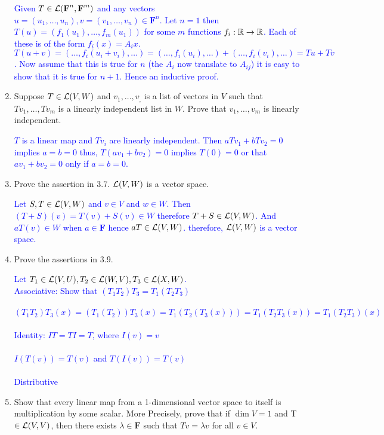 \documentclass[10pt,a4paper]{report}
\newcommand{\BLUE}[1]{\textcolor{blue}{#1}}
\newcommand{\F}{\textbf{F}}
\begin{document}
\begin{enumerate}
\BLUE{Given $T \in \LL(\F^n,\F^m)$ and any vectors $u=(u_1,\dots, u_n),v=(v_1,\dots,v_n) \in \F^n$.  Let $n=1$ then $T(u)=(f_1(u_1), \dots, f_m(u_1))$ for some $m$ functions $f_i: \mathbb{R} \to \mathbb{R}$. Each of these is of the form $f_i(x)= A_ix$. $T(u+v)=(\dots,f_i(u_i+v_i),\dots)=(\dots,f_i(u_i),\dots)+(\dots,f_i(v_i),\dots) = Tu+Tv$.  Now assume that this is true for $n$ (the $A_i$ now translate to $A_{ij}$) it is easy to show that it is true for $n+1$.  Hence an inductive proof.
}

\item Suppose $T \in \mathcal{L}(V,W)$ and $v_1,\dots,v_,$ is a list of vectors in $V$ such that $Tv_1,\dots,Tv_m$ is a linearly independent list in $W$.  Prove that $v_1, \dots, v_m$ is linearly independent.

\BLUE{$T$ is a linear map and $Tv_i$ are linearly independent.  Then $aTv_1+bTv_2=0$ implies $a=b=0$ thus, $T(av_1+bv_2)=0$ implies $T(0)=0$ or that $av_1+bv_2=0$ only if $a=b=0$.
}

\item Prove the assertion in 3.7.  $\mathcal{L}(V,W)$ is a vector space.

\BLUE{Let $S,T \in \mathcal{L}(V,W)$ and $v \in V$ and $w \in W$.  Then $(T+S)(v) = T(v)+S(v)\in W$ therefore $T+S \in \mathcal{L}(V,W)$.  And $aT(v) \in W$ when $a \in \F$ hence $aT \in \mathcal{L}(V,W)$.  therefore, $\mathcal{L}(V,W)$ is a vector space.
}

\item Prove the assertions in 3.9.

\BLUE{Let $T_1\in \mathcal{L}(V,U), T_2 \in \mathcal{L}(W,V), T_3 \in \mathcal{L}(X,W)$.\\
Associative: Show that $(T_1T_2)T_3 = T_1(T_2T_3)$\\
\\
$(T_1T_2)T_3(x)=(T_1(T_2))T_3(x)=T_1(T_2(T_3(x))) = T_1(T_2T_3(x))= T_1(T_2T_3)(x)$\\
\\
Identity: $IT=TI=T$, where $I(v)=v$\\
\\
$I(T(v))=T(v)$ and $T(I(v))=T(v)$\\
\\
Distributive\\
}

\item Show that every linear map from a 1-dimensional vector space to itself is multiplication by some scalar.  More Precisely, prove that if $\dim V =1$ and T$\in \mathcal{L}(V,V)$, then there exists $\lambda \in \F$ such that $Tv=\lambda v$ for all $v  \in V$.


\end{enumerate}
\end{document}
